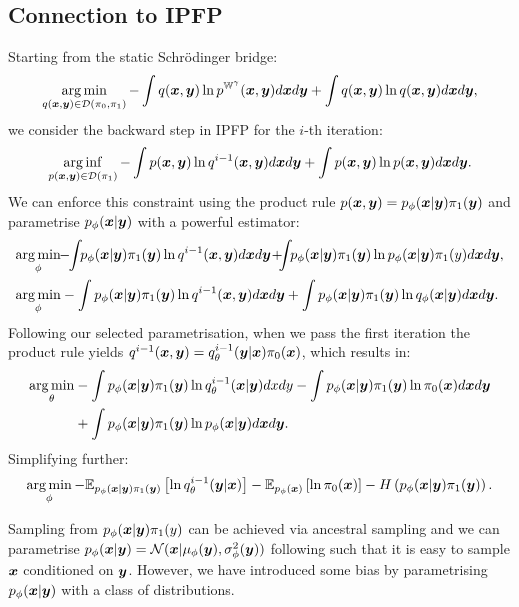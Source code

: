 \documentclass[a4paper,12pt,twoside,openright]{report}
\theoremstyle{definition}
\begin{document}
\subsection{Connection to IPFP}
Starting from the static Schrödinger bridge: 
\begin{align*}
\operatorname*{arg\,min}_{q({\bm{x}},{\bm{y}}) \in \mathcal{D}(\pi_0, \pi_1)}- \int q({\bm{x}},{\bm{y}}) \operatorname{ln} p^{\mathbb{W}^{\gamma}}({\bm{x}} ,{\bm{y}} )d{\bm{x}} d{\bm{y}} +\int q({\bm{x}},{\bm{y}}) \operatorname{ln} q({\bm{x}} ,{\bm{y}} )d{\bm{x}} d{\bm{y}},
\end{align*}
we consider the backward step in IPFP for the $i$-th iteration:
\begin{align*}
\operatorname*{arg\,inf}_{p({\bm{x}},{\bm{y}})  \in \mathcal{D}(\pi_1)}- \int p({\bm{x}},{\bm{y}})  \operatorname{ln} q^{i-1}({\bm{x}},{\bm{y}})d{\bm{x}} d{\bm{y}} +\int  p({\bm{x}},{\bm{y}}) \operatorname{ln}  p({\bm{x}},{\bm{y}}) d{\bm{x}} d{\bm{y}}.
\end{align*}
We can enforce this constraint using the product rule $p({\bm{x}},{\bm{y}}) = p_{\phi}({\bm{x}}|{\bm{y}}) \pi_1({\bm{y}})$  and parametrise $p_{\phi}({\bm{x}}|{\bm{y}})$ with a powerful estimator:
\begin{align*}
\argmin_{\phi}&\!\!-\!\!\int\!\!p_{\phi}(\vx|\vy) \pi_1(\vy) \log q^{i-1}(\vx,\vy)d\vx d\vy\!+\!\!\!\int\!\!p_{\phi}(\vx|\vy) \pi_1(\vy) \log p_{\phi}(\vx|\vy)
\pi_1(y)d\vx d\vy,\\
\argmin_{\phi}&- \int p_{\phi}(\vx|\vy) \pi_1(\vy) \log q^{i-1}(\vx,\vy)d\vx d\vy +\int p_{\phi}(\vx|\vy)\pi_1(\vy) \log q_{\phi}(\vx|\vy)
d\vx d\vy.
\end{align*}
Following our selected parametrisation, when we pass the first iteration the product rule yields $q^{i-1}({\bm{x}} , {\bm{y}})= q^{i-1}_{\theta}({\bm{y}}|{\bm{x}})\pi_0({\bm{x}})$, which results in:
\begin{align*}
\operatorname*{arg\,min}_\theta&- \int p_{\phi}({\bm{x}}|{\bm{y}}) \pi_1({\bm{y}}) \operatorname{ln}  q^{i-1}_{\theta}({\bm{x}}|{\bm{y}})dxdy - \int p_{\phi}({\bm{x}}|{\bm{y}}) \pi_1({\bm{y}}) \operatorname{ln}  \pi_0({\bm{x}}) d{\bm{x}} d{\bm{y}} \\
&+\int p_{\phi}({\bm{x}}|{\bm{y}}) \pi_1({\bm{y}}) \operatorname{ln} p_{\phi}({\bm{x}}|{\bm{y}})d{\bm{x}} d{\bm{y}}.
\end{align*}
Simplifying further:
\begin{align*}
\operatorname*{arg\,min}_\phi- \mathbb{E}_{p_{\phi}({\bm{x}}|{\bm{y}})\pi_1({\bm{y}})}\left[  \operatorname{ln}  q^{i-1}_{\theta}({\bm{y}}|{\bm{x}})\right] -  \mathbb{E}_{p_{\phi}({\bm{x}})}\left[ \operatorname{ln}  \pi_0({\bm{x}}) \right] - H\left(p_{\phi}({\bm{x}}|{\bm{y}})\pi_1({\bm{y}})\right).
\end{align*}

Sampling from $p_{\phi}({\bm{x}}|{\bm{y}})\pi_1(y)$ can be achieved via ancestral sampling and we can parametrise $p_{\phi}({\bm{x}}|{\bm{y}})={\mathcal{N}}({\bm{x}} | \mu_{\phi}({\bm{y}}), \sigma^2_\phi({\bm{y}}))$ following \cite{kingma2013auto} such that it is easy to sample ${\bm{x}}$ conditioned on ${\bm{y}}$. However, we have introduced some bias by parametrising $p_{\phi}({\bm{x}}|{\bm{y}})$ with a class of distributions.
\end{document}
